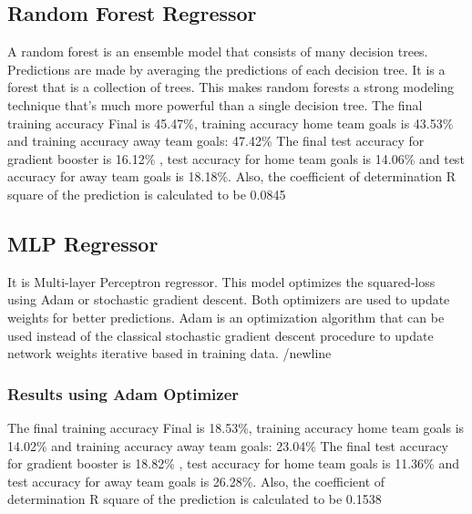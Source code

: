 \subsection{Random Forest Regressor}
A random forest is an ensemble model that consists of many decision trees. Predictions are made by averaging the predictions of each decision tree. It is a forest that is a collection of trees. This makes random forests a strong modeling technique that’s much more powerful than a single decision tree.\newline
The final training accuracy Final is 45.47\%, training accuracy home team goals is 43.53\% and training accuracy away team goals: 47.42\% \newline
The final test accuracy for gradient booster is 16.12\% , test accuracy for home team goals is 14.06\% and test accuracy for away team goals is 18.18\%. Also, the coefficient of determination R square of the prediction is calculated to be 0.0845 \newline 
\subsection{MLP Regressor}
It is Multi-layer Perceptron regressor. This model optimizes the squared-loss using Adam or stochastic gradient descent. Both optimizers are used to update weights for better predictions. Adam is an optimization algorithm that can be used instead of the classical stochastic gradient descent procedure to update network weights iterative based in training data. /newline
\subsubsection{Results using Adam Optimizer }
The final training accuracy Final is 18.53\%, training accuracy home team goals is 14.02\% and training accuracy away team goals: 23.04\% \newline
The final test accuracy for gradient booster is 18.82\% , test accuracy for home team goals is 11.36\% and test accuracy for away team goals is 26.28\%. Also, the coefficient of determination R square of the prediction is calculated to be 0.1538 \newline
